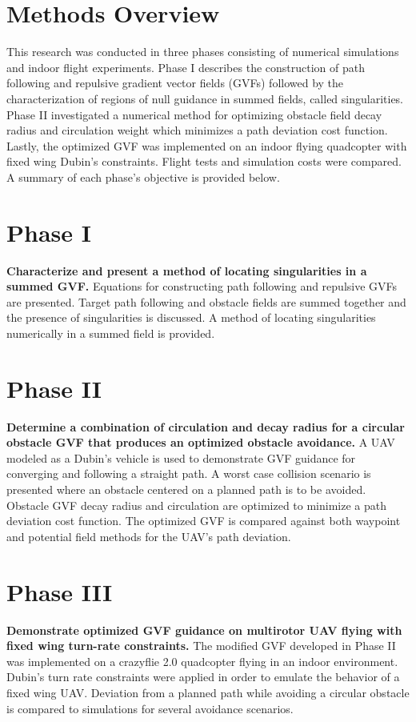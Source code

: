 \documentclass[numbered,pdftex]{ohio-etd}
\begin{document}
 \section{Methods Overview}
 
 This research was conducted in three phases consisting of numerical simulations and indoor flight experiments. Phase I describes the construction of path following and repulsive gradient vector fields (GVFs) followed by the characterization of regions of null guidance in summed fields, called singularities. Phase II investigated a numerical method for optimizing obstacle field decay radius and circulation weight which minimizes a path deviation cost function. Lastly, the optimized GVF was implemented on an indoor flying quadcopter with fixed wing Dubin's constraints. Flight tests and simulation costs were compared. A summary of each phase's objective is provided below.
 
 

 \section{Phase I}
 \textbf{Characterize and present a method of locating singularities in a summed GVF.}  Equations for constructing path following and repulsive GVFs are presented. Target path following and obstacle fields are summed together and the presence of singularities is discussed. A method of locating singularities numerically in a summed field is provided.
 
 
 
 \section{Phase II}
 \textbf{Determine a combination of circulation and decay radius for a circular obstacle GVF that produces an optimized obstacle avoidance.} A UAV modeled as a Dubin's vehicle is used to demonstrate GVF guidance for converging and following a straight path. A worst case collision scenario is presented where an obstacle centered on a planned path is to be avoided. Obstacle GVF decay radius and circulation are optimized to minimize a path deviation cost function. The optimized GVF is compared against both waypoint and potential field methods for the UAV's path deviation. 
 
 \section{Phase III}
 \textbf{Demonstrate optimized GVF guidance on multirotor UAV flying with fixed wing turn-rate constraints.} The modified GVF developed in Phase II was implemented on a crazyflie 2.0 quadcopter flying in an indoor environment.  Dubin's turn rate constraints were applied in order to emulate the behavior of a fixed wing UAV. Deviation from a planned path while avoiding a circular obstacle is compared to simulations for several avoidance scenarios.
\end{document}
